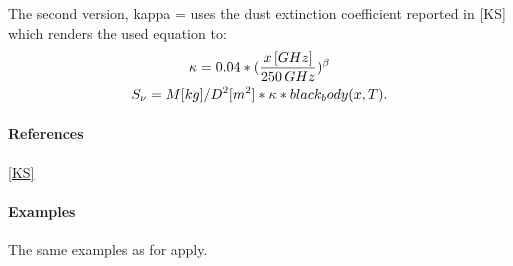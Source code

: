 \documentclass[a4paper,10pt,english]{sphinxmanual}
\begin{document}
\begin{fulllineitems}
The second version, kappa =  uses the dust extinction
coefficient reported in {[}KS{]} which renders the used equation to:
\begin{gather}
\begin{split}\kappa = 0.04 * (\frac{x\,[GHz]}{250\,GHz})^{\beta}\end{split}\notag\\\begin{split}S_{\nu} = M[kg] / D^2[m^2] * \kappa * black_body(x,T) .\end{split}\notag
\end{gather}\paragraph{References}

{\hyperref[functions:ks]{{[}KS{]}}}
\paragraph{Examples}

The same examples as for {\hyperref[functions:astrolyze.functions.astro_functions.black_body]{}} apply.

\end{fulllineitems}

\end{document}
